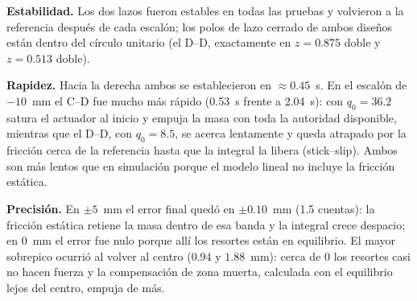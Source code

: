 \documentclass[conference]{IEEEtran}
\begin{document}
\begin{table}[H]
\centering
\caption{Resultados en la planta real (ISE en mm$^2\cdot$s)}
\label{tab:real}
\setlength{\tabcolsep}{3.5pt}
\end{table}

\textbf{Estabilidad.} Los dos lazos fueron estables en todas las pruebas y
volvieron a la referencia después de cada escalón; los polos de lazo cerrado
de ambos diseños están dentro del círculo unitario (el D--D, exactamente en
$z = 0.875$ doble y $z = 0.513$ doble).

\textbf{Rapidez.} Hacia la derecha ambos se establecieron en
$\approx0.45$~s. En el escalón de $-10$~mm el C--D fue mucho más rápido
(0.53~s frente a 2.04~s): con $q_0 = 36.2$ satura el actuador al inicio y
empuja la masa con toda la autoridad disponible, mientras que el D--D, con
$q_0 = 8.5$, se acerca lentamente y queda atrapado por la fricción cerca de la
referencia hasta que la integral la libera (stick--slip). Ambos son más lentos
que en simulación porque el modelo lineal no incluye la fricción estática.

\textbf{Precisión.} En $\pm5$~mm el error final quedó en $\pm0.10$~mm
(1.5 cuentas): la fricción estática retiene la masa dentro de esa banda y la
integral crece despacio; en 0~mm el error fue nulo porque allí los resortes
están en equilibrio. El mayor sobrepico ocurrió al volver al centro
($0.94$ y $1.88$~mm): cerca de 0 los resortes casi no hacen fuerza y la
compensación de zona muerta, calculada con el equilibrio lejos del centro,
empuja de más.
\end{document}

